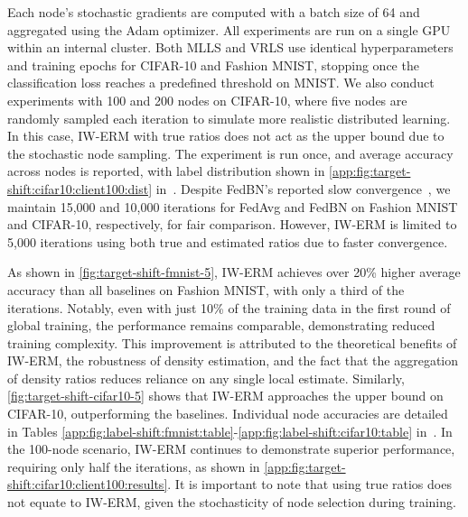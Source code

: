 Each node's stochastic gradients are computed with a batch size of 64 and aggregated using the Adam optimizer. All experiments are run on a single GPU within an internal cluster. Both MLLS and VRLS use identical hyperparameters and training epochs for CIFAR-10 and Fashion MNIST, stopping once the classification loss reaches a predefined threshold on MNIST. We also conduct experiments with 100 and 200 nodes on CIFAR-10, where five nodes are randomly sampled each iteration to simulate more realistic distributed learning. In this case, IW-ERM with true ratios does not act as the upper bound due to the stochastic node sampling. The experiment is run once, and average accuracy across nodes is reported, with label distribution shown in \cref{app:fig:target-shift:cifar10:client100:dist} in~. Despite FedBN's reported slow convergence~\citep{ali2023federated}, we maintain 15,000 and 10,000 iterations for FedAvg and FedBN on Fashion MNIST and CIFAR-10, respectively, for fair comparison. However, IW-ERM is limited to 5,000 iterations using both true and estimated ratios due to faster convergence.

As shown in \cref{fig:target-shift-fmnist-5}, IW-ERM achieves over 20\% higher average accuracy than all baselines on Fashion MNIST, with only a third of the iterations. Notably, even with just 10\% of the training data in the first round of global training, the performance remains comparable, demonstrating reduced training complexity. This improvement is attributed to the theoretical benefits of IW-ERM, the robustness of density estimation, and the fact that the aggregation of density ratios reduces reliance on any single local estimate.
Similarly, \cref{fig:target-shift-cifar10-5} shows that IW-ERM approaches the upper bound on CIFAR-10, outperforming the baselines. Individual node accuracies are detailed in Tables \ref{app:fig:label-shift:fmnist:table}-\ref{app:fig:label-shift:cifar10:table} in~. In the 100-node scenario, IW-ERM continues to demonstrate superior performance, requiring only half the iterations, as shown in \cref{app:fig:target-shift:cifar10:client100:results}. It is important to note that using true ratios does not equate to IW-ERM, given the stochasticity of node selection during training. 
